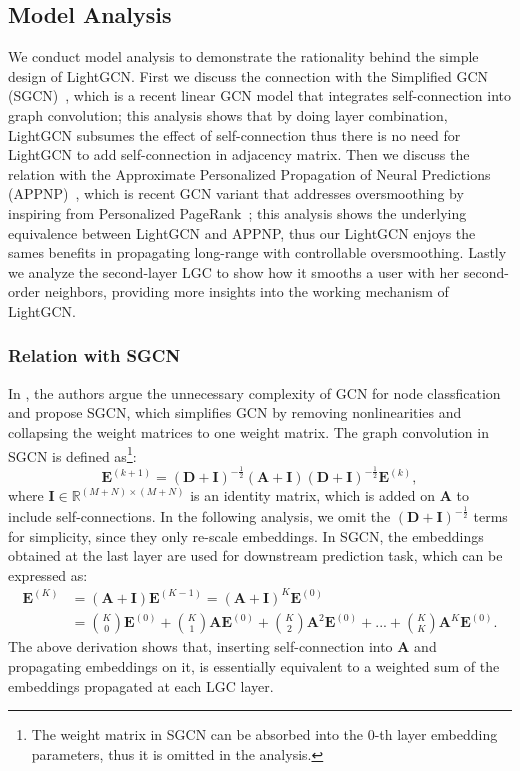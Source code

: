 \subsection{Model Analysis}
We conduct model analysis to demonstrate the rationality behind the simple design of LightGCN. 
First we discuss the connection with the Simplified GCN (SGCN)~\cite{SGCN}, which is a recent linear GCN model that integrates self-connection into graph convolution; this analysis shows that by doing layer combination, LightGCN subsumes the effect of self-connection thus there is no need for LightGCN to add self-connection in adjacency matrix. 
Then we discuss the relation with the Approximate Personalized Propagation of Neural Predictions (APPNP)~\cite{ICLR19-APPNP}, which is recent GCN variant that addresses oversmoothing by inspiring from Personalized PageRank~\cite{haveliwala2002topic}; this analysis shows the underlying equivalence between LightGCN and APPNP, thus our LightGCN enjoys the sames benefits in propagating long-range with controllable oversmoothing. 
Lastly we analyze the second-layer LGC to show how it smooths a user with her second-order neighbors, providing more insights into the working mechanism of LightGCN.  

\subsubsection{Relation with SGCN}\label{ss:relation-sgcn} In \cite{SGCN}, the authors argue the unnecessary complexity of GCN for node classfication and propose SGCN, which simplifies GCN by removing nonlinearities and collapsing the weight matrices to one weight matrix. The graph convolution in SGCN is defined as\footnote{The weight matrix in SGCN can be absorbed into the 0-th layer embedding parameters, thus it is omitted in the analysis.}:
\begin{equation}
    \textbf{E}^{(k+1)} = (\textbf{D}+\textbf{I})^{-\frac{1}{2}} (\textbf{A}+\textbf{I}) (\textbf{D}+\textbf{I})^{-\frac{1}{2}} \textbf{E}^{(k)},
\end{equation}
where $\textbf{I}\in \mathbb{R}^{(M+N)\times (M+N)}$ is an identity matrix, which is added on $\textbf{A}$ to include self-connections. 
In the following analysis, we omit the $(\textbf{D}+\textbf{I})^{-\frac{1}{2}}$ terms for simplicity, since they only re-scale embeddings. In SGCN, the embeddings obtained at the last layer are used for downstream prediction task, which can be expressed as:
\begin{equation}\label{eq:SGCN}
\begin{aligned}
    \textbf{E}^{(K)} &= (\textbf{A}+\textbf{I}) \textbf{E}^{(K-1)} = (\textbf{A}+\textbf{I})^K \textbf{E}^{(0)} \\
    &= \binom{K}{0}\textbf{E}^{(0)} + \binom{K}{1} \textbf{A} \textbf{E}^{(0)} + \binom{K}{2} \textbf{A}^2 \textbf{E}^{(0)} + ... + \binom{K}{K} \textbf{A}^K \textbf{E}^{(0)}.
\end{aligned}
\end{equation}
The above derivation shows that, inserting self-connection into $\textbf{A}$ and propagating embeddings on it, is essentially equivalent to a weighted sum of the embeddings propagated at each LGC layer. 

